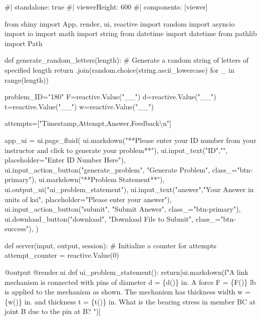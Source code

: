 \documentclass[
  letterpaper,
  DIV=11,
  numbers=noendperiod]{scrreprt}
\newenvironment{Shaded}{\begin{snugshade}}{\end{snugshade}}
\newcommand{\NormalTok}[1]{\textcolor[rgb]{0.00,0.23,0.31}{#1}}
\begin{document}
\begin{Shaded}
\begin{Highlighting}[]
\NormalTok{\#| standalone: true}
\NormalTok{\#| viewerHeight: 600}
\NormalTok{\#| components: [viewer]}

\NormalTok{from shiny import App, render, ui, reactive}
\NormalTok{import random}
\NormalTok{import asyncio}
\NormalTok{import io}
\NormalTok{import math}
\NormalTok{import string}
\NormalTok{from datetime import datetime}
\NormalTok{from pathlib import Path}

\NormalTok{def generate\_random\_letters(length):}
\NormalTok{    \# Generate a random string of letters of specified length}
\NormalTok{    return \textquotesingle{}\textquotesingle{}.join(random.choice(string.ascii\_lowercase) for \_ in range(length)) }

\NormalTok{problem\_ID="180"}
\NormalTok{F=reactive.Value("\_\_")}
\NormalTok{d=reactive.Value("\_\_")}
\NormalTok{t=reactive.Value("\_\_")}
\NormalTok{w=reactive.Value("\_\_")}



\NormalTok{attempts=["Timestamp,Attempt,Answer,Feedback\textbackslash{}n"]}

\NormalTok{app\_ui = ui.page\_fluid(}
\NormalTok{    ui.markdown("**Please enter your ID number from your instructor and click to generate your problem**"),}
\NormalTok{    ui.input\_text("ID","", placeholder="Enter ID Number Here"),}
\NormalTok{    ui.input\_action\_button("generate\_problem", "Generate Problem", class\_="btn{-}primary"),}
\NormalTok{    ui.markdown("**Problem Statement**"),}
\NormalTok{    ui.output\_ui("ui\_problem\_statement"),}
\NormalTok{    ui.input\_text("answer","Your Answer in units of ksi", placeholder="Please enter your answer"),}
\NormalTok{    ui.input\_action\_button("submit", "Submit Answer", class\_="btn{-}primary"),}
\NormalTok{    ui.download\_button("download", "Download File to Submit", class\_="btn{-}success"),}
\NormalTok{)}


\NormalTok{def server(input, output, session):}
\NormalTok{    \# Initialize a counter for attempts}
\NormalTok{    attempt\_counter = reactive.Value(0)  }
  
\NormalTok{    @output}
\NormalTok{    @render.ui}
\NormalTok{    def ui\_problem\_statement():}
\NormalTok{        return[ui.markdown(f"A link mechanism is connected with pins of diameter d = \{d()\} in. A force F = \{F()\} lb is applied to the mechanism as shown. The mechanism has thickness width w = \{w()\} in. and thickness t = \{t()\} in. What is the bearing stress in member BC at joint B due to the pin at B? ")]}
    

\end{Highlighting}
\end{Shaded}
\end{document}
